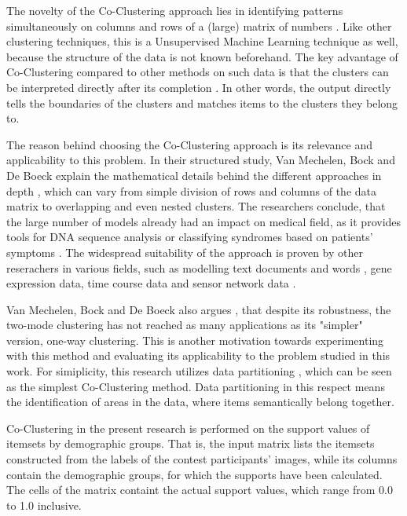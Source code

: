 The novelty of the Co-Clustering approach lies in identifying patterns simultaneously on columns and rows of a (large) matrix of numbers \cite{hartigan-direct-clustering-data-1972, coclustering}. Like other clustering techniques, this is a Unsupervised Machine Learning technique as well, because the structure of the data is not known beforehand. The key advantage of Co-Clustering compared to other methods on such data is that the clusters can be interpreted directly after its completion \cite{hartigan-direct-clustering-data-1972}. In other words, the output directly tells the boundaries of the clusters and matches items to the clusters they belong to.

The reason behind choosing the Co-Clustering approach is its relevance and applicability to this problem. In their structured study, Van Mechelen, Bock and De Boeck explain the mathematical details behind the different approaches in depth \cite{coclustering}, which can vary from simple division of rows and columns of the data matrix to overlapping and even nested clusters. The researchers conclude, that the large number of models already had an impact on medical field, as it provides tools for DNA sequence analysis or classifying syndromes based on patients' symptoms \cite{coclustering}. The widespread suitability of the approach is proven by other reserachers in various fields, such as modelling text documents and words \cite{coclustering_documents}, gene expression data, time course data and sensor network data \cite{cho2008co}. 

Van Mechelen, Bock and De Boeck also argues \cite{coclustering}, that despite its robustness, the two-mode clustering has not reached as many applications as its "simpler" version, one-way clustering. This is another motivation towards experimenting with this method and evaluating its applicability to the problem studied in this work. For simiplicity, this research utilizes data partitioning \cite{coclustering}, which can be seen as the simplest Co-Clustering method. Data partitioning in this respect means the identification of areas in the data, where items semantically belong together. 

Co-Clustering in the present research is performed on the support values of itemsets by demographic groups. That is, the input matrix lists the itemsets constructed from the labels of the contest participants' images, while its columns contain the demographic groups, for which the supports have been calculated. The cells of the matrix containt the actual support values, which range from 0.0 to 1.0 inclusive.  

